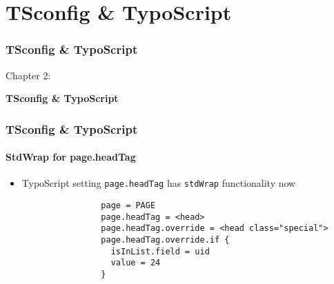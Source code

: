 %

\section{TSconfig \& TypoScript}
\begin{frame}[fragile]
	\frametitle{TSconfig \& TypoScript}

	\begin{center}\huge{Chapter 2:}\end{center}
	\begin{center}\huge{\color{typo3darkgrey}\textbf{TSconfig \& TypoScript}}\end{center}

\end{frame}


\begin{frame}[fragile]
	\frametitle{TSconfig \& TypoScript}
	\framesubtitle{StdWrap for page.headTag}

	\begin{itemize}
		\item TypoScript setting \texttt{page.headTag} has \texttt{stdWrap} functionality now

			\begin{lstlisting}
				page = PAGE
				page.headTag = <head>
				page.headTag.override = <head class="special">
				page.headTag.override.if {
		  		  isInList.field = uid
		  		  value = 24
				}
			\end{lstlisting}	

	\end{itemize}

\end{frame}

